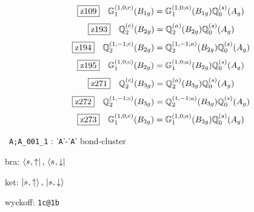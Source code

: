 \documentclass[fleqn,10pt,landscape]{jsarticle}
\begin{document}
\begin{dmath*}
\hspace*{3mm}\fbox{z109}\quad \mathbb{G}_{1}^{(1,0;c)}(B_{1g})=\mathbb{G}_{1}^{(1,0;a)}(B_{1g}) \mathbb{Q}_{0}^{(s)}(A_{g})
\end{dmath*}
\begin{dmath*}
\hspace*{3mm}\fbox{z193}\quad \mathbb{Q}_{2}^{(c)}(B_{2g})=\mathbb{Q}_{2}^{(a)}(B_{2g}) \mathbb{Q}_{0}^{(s)}(A_{g})
\end{dmath*}
\begin{dmath*}
\hspace*{3mm}\fbox{z194}\quad \mathbb{Q}_{2}^{(1,-1;c)}(B_{2g})=\mathbb{Q}_{2}^{(1,-1;a)}(B_{2g}) \mathbb{Q}_{0}^{(s)}(A_{g})
\end{dmath*}
\begin{dmath*}
\hspace*{3mm}\fbox{z195}\quad \mathbb{G}_{1}^{(1,0;c)}(B_{2g})=\mathbb{G}_{1}^{(1,0;a)}(B_{2g}) \mathbb{Q}_{0}^{(s)}(A_{g})
\end{dmath*}
\begin{dmath*}
\hspace*{3mm}\fbox{z271}\quad \mathbb{Q}_{2}^{(c)}(B_{3g})=\mathbb{Q}_{2}^{(a)}(B_{3g}) \mathbb{Q}_{0}^{(s)}(A_{g})
\end{dmath*}
\begin{dmath*}
\hspace*{3mm}\fbox{z272}\quad \mathbb{Q}_{2}^{(1,-1;c)}(B_{3g})=\mathbb{Q}_{2}^{(1,-1;a)}(B_{3g}) \mathbb{Q}_{0}^{(s)}(A_{g})
\end{dmath*}
\begin{dmath*}
\hspace*{3mm}\fbox{z273}\quad \mathbb{G}_{1}^{(1,0;c)}(B_{3g})=\mathbb{G}_{1}^{(1,0;a)}(B_{3g}) \mathbb{Q}_{0}^{(s)}(A_{g})
\end{dmath*}
\vspace{5mm}

\noindent\textbullet\, \texttt{A;A_001_1} : '\texttt{A}'-'\texttt{A}' bond-cluster

\noindent\quad * bra: $\bra{s_{},\uparrow},\, \bra{s_{},\downarrow}$

\noindent\quad * ket: $\ket{s_{},\uparrow},\, \ket{s_{},\downarrow}$

\noindent\quad * wyckoff: \texttt{1c@1b}
\end{document}
